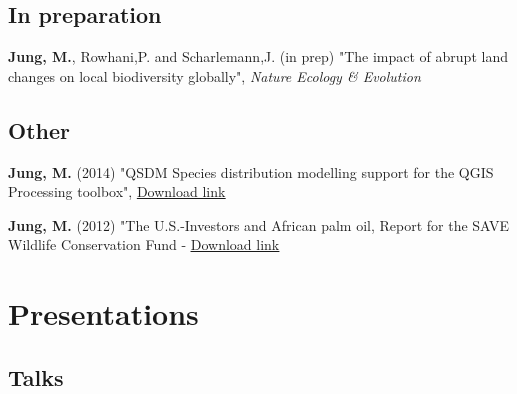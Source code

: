 \documentclass[12pt,a4paper,serif]{moderncv}        %
\begin{document}
\vspace{8pt}

\subsection{In preparation}
\vspace{2pt}
\begin{bibenum}

 \item[] \textbf{Jung, M.}, Rowhani,P. and Scharlemann,J. (in prep) "The impact of abrupt land changes on local biodiversity globally", \emph{Nature Ecology \& Evolution}

\end{bibenum}

\vspace{8pt}
\subsection{Other}
\vspace{2pt}
\begin{bibenum}

  \item[] \textbf{Jung, M.} (2014) "QSDM Species distribution modelling support for the QGIS Processing toolbox", \href{http://plugins.qgis.org/plugins/QSDM/}{\underline{Download link}}
  
  \item[] \textbf{Jung, M.} (2012) "The U.S.-Investors and African palm oil, Report for the SAVE Wildlife Conservation Fund - \href{https://save-wildlife.org/fileadmin/documents/Regenwaldschutz/Kamerun/us_investors_and_african_palm_oil.pdf}{\underline{Download link}}

\end{bibenum}


\section{Presentations}

\subsection{Talks}
\vspace{6pt}
\end{document}
